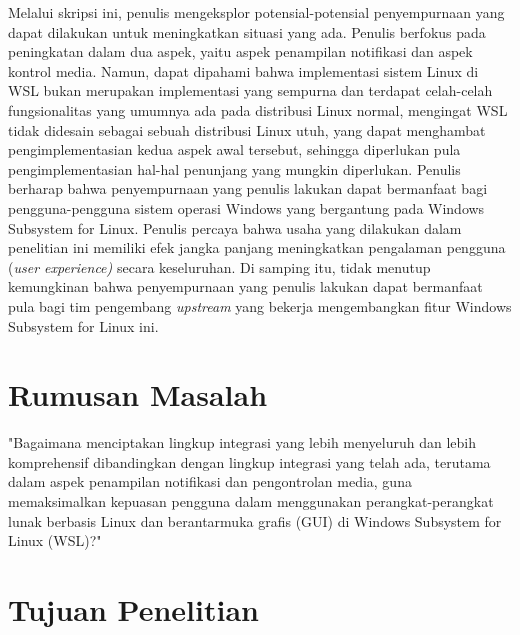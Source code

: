 Melalui skripsi ini, penulis mengeksplor potensial-potensial penyempurnaan yang dapat dilakukan untuk meningkatkan situasi yang ada. Penulis berfokus pada peningkatan dalam dua aspek, yaitu aspek penampilan notifikasi dan aspek kontrol media. Namun, dapat dipahami bahwa implementasi sistem Linux di WSL bukan merupakan implementasi yang sempurna dan terdapat celah-celah fungsionalitas yang umumnya ada pada distribusi Linux normal, mengingat WSL tidak didesain sebagai sebuah distribusi Linux utuh, yang dapat menghambat pengimplementasian kedua aspek awal tersebut, sehingga diperlukan pula pengimplementasian hal-hal penunjang yang mungkin diperlukan. Penulis berharap bahwa penyempurnaan yang penulis lakukan dapat bermanfaat bagi pengguna-pengguna sistem operasi Windows yang bergantung pada Windows Subsystem for Linux. Penulis percaya bahwa usaha yang dilakukan dalam penelitian ini memiliki efek jangka panjang meningkatkan pengalaman pengguna (\textit{user experience)} secara keseluruhan. Di samping itu, tidak menutup kemungkinan bahwa penyempurnaan yang penulis lakukan dapat bermanfaat pula bagi tim pengembang \textit{upstream} yang bekerja mengembangkan fitur Windows Subsystem for Linux ini.

\section{Rumusan Masalah}

"Bagaimana menciptakan lingkup integrasi yang lebih menyeluruh dan lebih komprehensif dibandingkan dengan lingkup integrasi yang telah ada, terutama dalam aspek penampilan notifikasi dan pengontrolan media, guna memaksimalkan kepuasan pengguna dalam menggunakan perangkat-perangkat lunak berbasis Linux dan berantarmuka grafis (GUI) di Windows Subsystem for Linux (WSL)?"


\section{Tujuan Penelitian}


